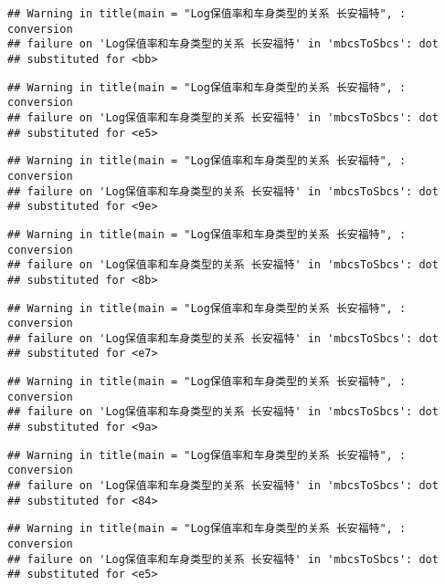 \documentclass[]{article}
\begin{document}
\begin{verbatim}
## Warning in title(main = "Log保值率和车身类型的关系 长安福特", : conversion
## failure on 'Log保值率和车身类型的关系 长安福特' in 'mbcsToSbcs': dot
## substituted for <bb>
\end{verbatim}

\begin{verbatim}
## Warning in title(main = "Log保值率和车身类型的关系 长安福特", : conversion
## failure on 'Log保值率和车身类型的关系 长安福特' in 'mbcsToSbcs': dot
## substituted for <e5>
\end{verbatim}

\begin{verbatim}
## Warning in title(main = "Log保值率和车身类型的关系 长安福特", : conversion
## failure on 'Log保值率和车身类型的关系 长安福特' in 'mbcsToSbcs': dot
## substituted for <9e>
\end{verbatim}

\begin{verbatim}
## Warning in title(main = "Log保值率和车身类型的关系 长安福特", : conversion
## failure on 'Log保值率和车身类型的关系 长安福特' in 'mbcsToSbcs': dot
## substituted for <8b>
\end{verbatim}

\begin{verbatim}
## Warning in title(main = "Log保值率和车身类型的关系 长安福特", : conversion
## failure on 'Log保值率和车身类型的关系 长安福特' in 'mbcsToSbcs': dot
## substituted for <e7>
\end{verbatim}

\begin{verbatim}
## Warning in title(main = "Log保值率和车身类型的关系 长安福特", : conversion
## failure on 'Log保值率和车身类型的关系 长安福特' in 'mbcsToSbcs': dot
## substituted for <9a>
\end{verbatim}

\begin{verbatim}
## Warning in title(main = "Log保值率和车身类型的关系 长安福特", : conversion
## failure on 'Log保值率和车身类型的关系 长安福特' in 'mbcsToSbcs': dot
## substituted for <84>
\end{verbatim}

\begin{verbatim}
## Warning in title(main = "Log保值率和车身类型的关系 长安福特", : conversion
## failure on 'Log保值率和车身类型的关系 长安福特' in 'mbcsToSbcs': dot
## substituted for <e5>
\end{verbatim}
\end{document}
